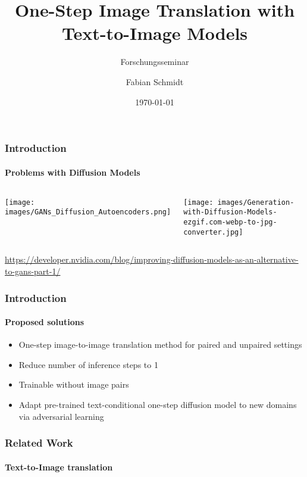 \documentclass[aspectratio=169, lecture, amberg]{OTHAWbeamer}
\title[Forschungsseminar]{One-Step Image Translation with Text-to-Image Models}
\subtitle{Forschungsseminar}
\author[Schmidt]{Fabian Schmidt}
\date{\today}
\begin{document}
\maketitle

\begin{frame}
\frametitle{Introduction}
\framesubtitle{Problems with Diffusion Models}

\begin{columns}
    \centering
    \texttt{[image: images/GANs\_Diffusion\_Autoencoders.png]}

    \centering
    \texttt{[image: images/Generation-with-Diffusion-Models-ezgif.com-webp-to-jpg-converter.jpg]}
  \end{columns}
  \tiny{\footnotemark \url{https://developer.nvidia.com/blog/improving-diffusion-models-as-an-alternative-to-gans-part-1/}}
\end{frame}


\begin{frame}
\frametitle{Introduction}
\framesubtitle{Proposed solutions}
\begin{itemize}
    \item One-step image-to-image translation method for paired and unpaired settings
    \item Reduce number of inference steps to 1
    \item Trainable without image pairs
    \item Adapt pre-trained text-conditional one-step diffusion model to new domains via adversarial learning
\end{itemize}
\end{frame}

\begin{frame}
\frametitle{Related Work}
\framesubtitle{Text-to-Image translation}

\end{frame}
\end{document}
